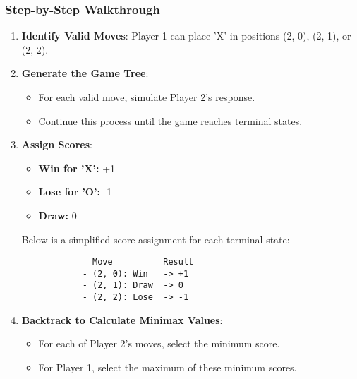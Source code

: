 \documentclass[aspectratio=169]{beamer}
\begin{document}
\begin{frame}[fragile]
    \frametitle{Step-by-Step Walkthrough}
    \begin{enumerate}
        \item \textbf{Identify Valid Moves}: Player 1 can place 'X' in positions (2, 0), (2, 1), or (2, 2).
        \item \textbf{Generate the Game Tree}:
            \begin{itemize}
                \item For each valid move, simulate Player 2's response.
                \item Continue this process until the game reaches terminal states.
            \end{itemize}
        \item \textbf{Assign Scores}:
            \begin{itemize}
                \item \textbf{Win for 'X':} +1
                \item \textbf{Lose for 'O':} -1
                \item \textbf{Draw:} 0
            \end{itemize}
            Below is a simplified score assignment for each terminal state:
            \begin{verbatim}
              Move          Result
            - (2, 0): Win   -> +1
            - (2, 1): Draw  -> 0
            - (2, 2): Lose  -> -1
            \end{verbatim}
        \item \textbf{Backtrack to Calculate Minimax Values}:
            \begin{itemize}
                \item For each of Player 2's moves, select the minimum score.
                \item For Player 1, select the maximum of these minimum scores.
            \end{itemize}
    \end{enumerate}
\end{frame}
\end{document}
